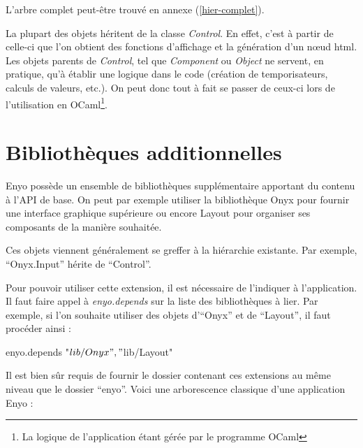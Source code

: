 \documentclass[11pt,a4paper]{report}
\begin{document}
L'arbre complet peut-être trouvé en annexe (\ref{hier-complet}).

La plupart des objets héritent de la classe \emph{Control}. En effet, c'est à partir de celle-ci
que l'on obtient des fonctions d'affichage et la génération d'un n\oe{}ud html.
Les objets parents de \emph{Control}, tel que \emph{Component} ou \emph{Object} ne servent, en pratique,
qu'à établir une logique dans le code (création de temporisateurs, calculs de valeurs, etc.).
On peut donc tout à fait se passer de ceux-ci lors de l'utilisation en OCaml\footnote{La logique de
l'application étant gérée par le programme OCaml}.

\section{Bibliothèques additionnelles}

Enyo possède un ensemble de bibliothèques supplémentaire apportant du contenu à l'API de base.
On peut par exemple utiliser la bibliothèque Onyx pour fournir une interface graphique 
supérieure ou encore Layout pour organiser ses composants de la manière souhaitée.

Ces objets viennent généralement se greffer à la hiérarchie existante. Par exemple,
``Onyx.Input'' hérite de ``Control''.

Pour pouvoir utiliser cette extension, il est nécessaire de l'indiquer à l'application.
Il faut faire appel à \emph{enyo.depends} sur la liste des bibliothèques à lier.
Par exemple, si l'on souhaite utiliser des objets d'``Onyx'' et de ``Layout'', il faut procéder ainsi :

\begin{JavaScript}
  enyo.depends{ "$lib/Onyx", "$lib/Layout"}
\end{JavaScript}

Il est bien sûr requis de fournir le dossier contenant ces extensions au même niveau que le dossier
``enyo''. Voici une arborescence classique d'une application Enyo :

\begin{center}
\end{center}
\end{document}
